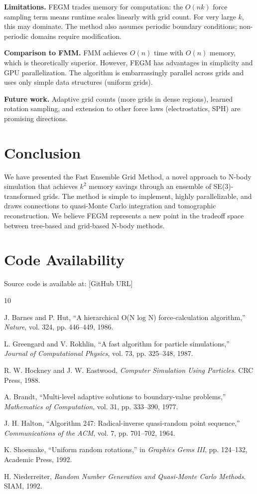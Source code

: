 \documentclass[11pt,twocolumn]{article}
\begin{document}
\textbf{Limitations.} FEGM trades memory for computation: the $O(nk)$ force sampling term means runtime scales linearly with grid count. For very large $k$, this may dominate. The method also assumes periodic boundary conditions; non-periodic domains require modification.

\textbf{Comparison to FMM.} FMM achieves $O(n)$ time with $O(n)$ memory, which is theoretically superior. However, FEGM has advantages in simplicity and GPU parallelization. The algorithm is embarrassingly parallel across grids and uses only simple data structures (uniform grids).

\textbf{Future work.} Adaptive grid counts (more grids in dense regions), learned rotation sampling, and extension to other force laws (electrostatics, SPH) are promising directions.

\section{Conclusion}

We have presented the Fast Ensemble Grid Method, a novel approach to N-body simulation that achieves $k^2$ memory savings through an ensemble of SE(3)-transformed grids. The method is simple to implement, highly parallelizable, and draws connections to quasi-Monte Carlo integration and tomographic reconstruction. We believe FEGM represents a new point in the tradeoff space between tree-based and grid-based N-body methods.

\section*{Code Availability}

Source code is available at: [GitHub URL]

\begin{thebibliography}{10}

J. Barnes and P. Hut, ``A hierarchical O(N log N) force-calculation algorithm,'' \textit{Nature}, vol. 324, pp. 446--449, 1986.

L. Greengard and V. Rokhlin, ``A fast algorithm for particle simulations,'' \textit{Journal of Computational Physics}, vol. 73, pp. 325--348, 1987.

R. W. Hockney and J. W. Eastwood, \textit{Computer Simulation Using Particles}. CRC Press, 1988.

A. Brandt, ``Multi-level adaptive solutions to boundary-value problems,'' \textit{Mathematics of Computation}, vol. 31, pp. 333--390, 1977.

J. H. Halton, ``Algorithm 247: Radical-inverse quasi-random point sequence,'' \textit{Communications of the ACM}, vol. 7, pp. 701--702, 1964.

K. Shoemake, ``Uniform random rotations,'' in \textit{Graphics Gems III}, pp. 124--132, Academic Press, 1992.

H. Niederreiter, \textit{Random Number Generation and Quasi-Monte Carlo Methods}. SIAM, 1992.

\end{thebibliography}
\end{document}
